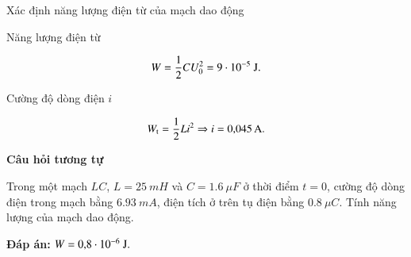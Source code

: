 \begin{dang}{Xác định năng lượng điện từ của mạch dao động}
{		Năng lượng điện từ
		
		$$W = \dfrac{1}{2}CU_0^2 = 9 \cdot 10^{-5}\ \text J.$$
		
		Cường độ dòng điện $i$
		
		$$ W_\text t =\dfrac{1}{2} Li^2 \Rightarrow i = \SI{0,045}{A}.$$
		
		\begin{center}
			\textbf{Câu hỏi tương tự}
		\end{center}
		
		Trong một mạch $LC$, $L = \SI{25}{mH}$ và $C = \SI{1,6}{\mu F}$ ở thời điểm $t = 0$, cường độ dòng điện trong mạch bằng $\SI{6,93}{mA}$, điện tích ở trên tụ điện bằng $\SI{0,8}{\mu C}$. Tính năng lượng của mạch dao động.
		
		\textbf{Đáp án:} $W = \text{0,8}\cdot 10^{-6}\ \text J.$
	}
	
\end{dang}
